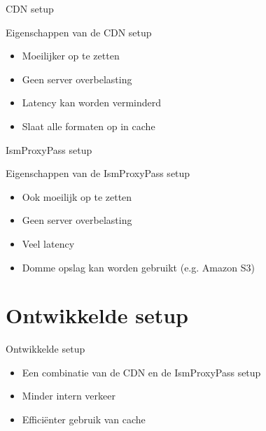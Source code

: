 \documentclass[xcolor=svgnames]{beamer}
\begin{document}
\begin{frame}{CDN setup}
    \begin{figure}

        \resizebox*{!}{\dimexpr\textheight-2\baselineskip\relax}{%
            
        }
    \end{figure}
\end{frame}

\begin{frame}{Eigenschappen van de CDN setup}
  \begin{itemize}
  \item Moeilijker op te zetten
  \item Geen server overbelasting
  \item Latency kan worden verminderd
  \item Slaat alle formaten op in cache
  \end{itemize}
\end{frame}

\begin{frame}{IsmProxyPass setup}
    \begin{figure}

        \resizebox*{!}{\dimexpr\textheight-2\baselineskip\relax}{%
            
        }
    \end{figure}
\end{frame}

\begin{frame}{Eigenschappen van de IsmProxyPass setup}
  \begin{itemize}
  \item Ook moeilijk op te zetten
  \item Geen server overbelasting
  \item Veel latency
  \item Domme opslag kan worden gebruikt (e.g. Amazon S3)
  \end{itemize}
\end{frame}


\section{Ontwikkelde setup}

\begin{frame}{Ontwikkelde setup}
    \begin{itemize}
        \item Een combinatie van de CDN en de IsmProxyPass setup
        \item Minder intern verkeer
        \item Efficiënter gebruik van cache
    \end{itemize}
\end{frame}
\end{document}
